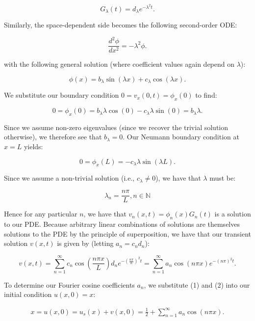 \begin{solution}
    $$
    G_{\lambda}(t) = d_{\lambda}e^{-\lambda^2 t}.
    $$

    Similarly, the space-dependent side becomes the following second-order ODE:

    $$
    \frac{d^2 \phi}{d x^2} = -\lambda^2 \phi.
    $$

    with the following general solution (where coefficient values again depend on $\lambda$):

    $$
    \phi(x) = b_{\lambda} \sin{(\lambda x)} + c_{\lambda} \cos{(\lambda x)}.
    $$

    We substitute our boundary condition $0 = v_x(0, t) = \phi_x(0)$ to find:

    $$
    0 = \phi_x(0) = b_{\lambda} \lambda \cos{(0)} - c_{\lambda} \lambda \sin{(0)} = b_{\lambda} \lambda.
    $$

    Since we assume non-zero eigenvalues (since we recover the trivial solution otherwise), we therefore see that 
    $b_{\lambda} = 0$. Our Neumann boundary condition at $x = L$ yields:

    $$
    0 = \phi_x(L) = -c_{\lambda} \lambda \sin{(\lambda L)}.
    $$

    Since we assume a non-trivial solution (i.e., $c_{\lambda} \neq 0$), we have that $\lambda$ must be:

    $$
    \lambda_n = \frac{n \pi}{L}, n \in \mathbb{N}
    $$

    Hence for any particular $n$, we have that $v_n(x, t) = \phi_n(x)G_n(t)$ is a solution to our PDE. Because arbitrary
    linear combinations of solutions are themselves solutions to the PDE by the principle of superposition, we have that
    our transient solution $v(x, t)$ is given by (letting $a_n = c_n d_n$):

    \begin{equation}
    v(x, t) = \sum\limits_{n=1}^{\infty}{c_n \cos{\left(\frac{n \pi x}{L}\right)}} d_n e^{-\left(\frac{n \pi}{L}\right)^2 t}
            = \sum\limits_{n=1}^{\infty}{a_n \cos{(n \pi x)}} e^{-(n \pi)^2 t}.
    \end{equation}

    To determine our Fourier cosine coefficients $a_n$, we substitute (1) and (2) into our initial condition 
    $u(x, 0) = x$:

    \begin{align*}
        x = u(x, 0) = u_s(x) + v(x, 0) = \frac{1}{2} + \sum\limits_{n=1}^{\infty}{a_n \cos{(n \pi x)}}.
    \end{align*}


\end{solution}
